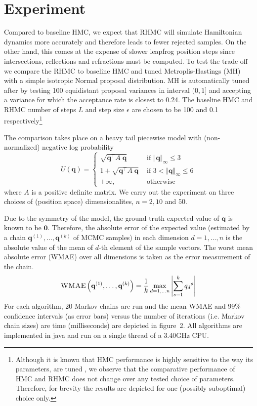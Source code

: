 \documentclass{article} %
\newcommand{\bvec}[1]{\textbf{#1}}
\newcommand{\case}[2]{#2 &\text{ if } #1}%
\newcommand{\otherwise}[1]{#1 &\text{ otherwise}}
\begin{document}
\section{Experiment} \label{sect:example}
Compared to baseline HMC, we expect that RHMC will simulate Hamiltonian dynamics more accurately and therefore leads to fewer rejected samples.  On the other hand, this comes at the expense of slower leapfrog position steps since intersections, reflections and refractions must be computed. To test the trade off we    
compare the RHMC to baseline HMC \cite{neal2011mcmc} and tuned Metroplis-Hastings (MH) with a simple isotropic Normal proposal distribution.  MH is automatically tuned after \cite{roberts1997weak} by testing 100 equidistant proposal variances in interval $(0, 1]$ and accepting a variance for which the acceptance rate is closest to 0.24.
The baseline HMC and RHMC number of steps $L$ and step size $\epsilon$ are chosen to be 100 and 0.1 respectively\footnote{
Although it is known that HMC performance is highly sensitive to the way its parameters, are tuned \cite{homan2014no}, we observe that the comparative performance of HMC and RHMC does not change over any tested choice of parameters. Therefore, for brevity the results are depicted for one (possibly suboptimal) choice only.
}

The comparison takes place on a heavy tail piecewise model with (non-normalized) negative log probability  
\[
U(\bvec{q}) =
\begin{cases}
\case{\Vert \bvec{q} \Vert_\infty \leq 3}{\sqrt{\bvec{q}^\top A \; \bvec{q}}}\\
\case{3 < \Vert \bvec{q} \Vert_\infty \leq 6 }{1 + \sqrt{\bvec{q}^\top A \; \bvec{q}}}\\
\otherwise{+ \infty,}
\end{cases}
\] 
where $A$ is a positive definite matrix.  We carry out the experiment on three choices of (position space) dimensionalites,  $n = 2, 10$ and $50$.


Due to the symmetry of the model, the ground truth expected value of $\bvec{q}$ is known to be $\bvec{0}$.
Therefore, the absolute error of the expected value (estimated by a chain $\bvec{q}^{(1)}, \ldots, \bvec{q}^{(k)}$ of MCMC samples) in each dimension $d = 1, \ldots, n$ is 
the absolute value of the mean of $d$-th element of the sample vectors.
The worst mean absolute error (WMAE) over all dimensions is taken as the error measurement of the chain.
\[
\textsc{WMAE} \left( \bvec{q}^{(1)}, \ldots, \bvec{q}^{(k)} \right) = \frac{1}{k}
\max_{d=1, \ldots n} 
\left|\sum_{s=1}^k {q_d}^{s} \right|
\]
For each algorithm, 20 Markov chains are run and the mean WMAE and 99\% confidence intervals (as error bars) versus the number of iterations (i.e. Markov chain sizes) are time (milliseconds) are depicted in 
figure~2. All algorithms are implemented in java and run on a single thread of a 3.40GHz CPU.
\end{document}
